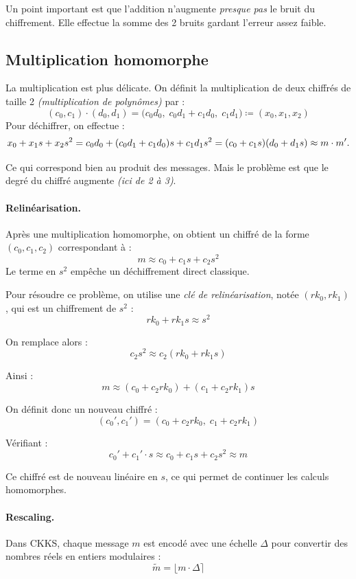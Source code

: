 Un point important est que l'addition n'augmente \emph{presque pas} le bruit du chiffrement. Elle effectue la somme des 2 bruits gardant l'erreur assez faible.

\subsection{Multiplication homomorphe}

La multiplication est plus délicate. On définit la multiplication de deux chiffrés de taille 2 \emph{(multiplication de polynômes)} par :
\[
(c_0,c_1)\cdot(d_0,d_1)
=
\bigl(
c_0d_0,\;
c_0d_1+c_1d_0,\;
c_1d_1
\bigr) \coloneqq (x_0, x_1, x_2)
\] 
Pour déchiffrer, on effectue : 
\[
x_0 + x_1 s + x_2 s^2
  = c_0d_0 + (c_0d_1+c_1d_0)s + c_1d_1s^2
  = (c_0 + c_1 s)(d_0 + d_1 s) \\
  \approx m \cdot m'.
\]

Ce qui correspond bien au produit des messages. Mais le problème est que le degré du chiffré augmente \emph{(ici de 2 à 3)}.

\paragraph{Relinéarisation.}
Après une multiplication homomorphe, on obtient un chiffré de la forme $(c_0, c_1, c_2)$ correspondant à :
\[
m \approx c_0 + c_1 s + c_2 s^2
\]
Le terme en $s^2$ empêche un déchiffrement direct classique.

Pour résoudre ce problème, on utilise une \emph{clé de relinéarisation}, notée $(rk_0, rk_1)$, qui est un chiffrement de $s^2$ :
\[
rk_0 + rk_1 s \approx s^2
\]

On remplace alors :
\[
c_2 s^2 \approx c_2 (rk_0 + rk_1 s)
\]

Ainsi :
\[
m \approx (c_0 + c_2 rk_0) + (c_1 + c_2 rk_1)s
\]

On définit donc un nouveau chiffré :
\[
(c_0', c_1') = (c_0 + c_2 rk_0,\; c_1 + c_2 rk_1)
\]

Vérifiant : 
\[
c_0' + c_1' \cdot s \approx c_0 + c_1 s + c_2 s^2 \approx m
\]

Ce chiffré est de nouveau linéaire en $s$, ce qui permet de continuer les calculs homomorphes.

\paragraph{Rescaling.}
Dans CKKS, chaque message $m$ est encodé avec une échelle $\Delta$ pour convertir des nombres réels en entiers modulaires :
\[
\tilde{m} = \lfloor m \cdot \Delta \rceil
\]

